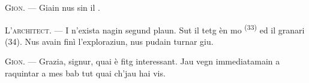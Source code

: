 \textsc{Gion}. --- Giain nus sin il .

\textsc{L'architect}. --- I n'exista nagin segund plaun. Sut il tetg èn mo
 \textsuperscript{(33)} ed il granari (34). Nus avain finì
l'exploraziun, nus pudain turnar giu.

\textsc{Gion}. --- Grazia, signur, quai è fitg interessant. Jau vegn immediatamain a
raquintar a mes bab tut quai ch'jau hai vis.

\VUsaut{4.0mm}
\VUfilet{22mm}
